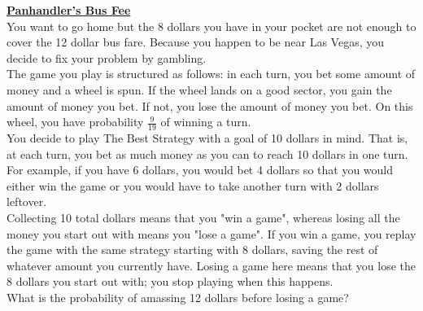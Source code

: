 \documentclass[12pt]{article}
\begin{document}
\setcounter{MaxMatrixCols}{20}
\setlength\parindent{0pt}

\textbf{\underline{Panhandler's Bus Fee}}\\

You want to go home but the 8 dollars you have in your pocket are not enough to cover the 12 dollar bus fare. Because you happen to be near Las Vegas, you decide to fix your problem by gambling.\\

The game you play is structured as follows: in each turn, you bet some amount of money and a wheel is spun. If the wheel lands on a good sector, you gain the amount of money you bet. If not, you lose the amount of money you bet. On this wheel, you have probability $\frac{9}{19}$ of winning a turn.\\

You decide to play The Best Strategy with a goal of 10 dollars in mind. That is, at each turn, you bet as much money as you can to reach 10 dollars in one turn. For example, if you have 6 dollars, you would bet 4 dollars so that you would either win the game or you would have to take another turn with 2 dollars leftover.\\

Collecting 10 total dollars means that you "win a game", whereas losing all the money you start out with means you "lose a game". If you win a game, you replay the game with the same strategy starting with 8 dollars, saving the rest of whatever amount you currently have. Losing a game here means that you lose the 8 dollars you start out with; you stop playing when this happens.\\

{\color{blue} What is the probability of amassing 12 dollars before losing a game?}\\
\end{document}
